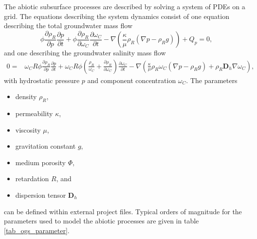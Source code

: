 The abiotic subsurface processes are described by solving a system of PDEs on a grid. The equations describing the system dynamics consist of one equation describing the total groundwater mass flow 
\begin{equation}
\phi\frac{\partial  \rho_R}{\partial p}\frac{\partial p}{\partial t} + \phi\frac{\partial \rho_R}{\partial \omega_C}\frac{\partial \omega_C}{\partial t} - \nabla \left(\frac{\kappa}{\mu}\rho_R \left(\nabla p - \rho_R g \right)\right) + Q_p = 0,
\end{equation}
and one describing the groundwater salinity mass flow
\begin{equation}
\begin{split}
0 =&
\omega_C R\phi\frac{\partial  \rho_R }{\partial p}\frac{\partial p}{\partial t}+\omega_C R\phi\left(\frac{\rho_R}{\omega_C}+\frac{\partial  \rho_R }{\partial \omega_C}\right)\frac{\partial \omega_C}{\partial t} - \nabla \left(  \frac{\kappa}{\mu} \rho_R \omega_C \left(\nabla p - \rho_R g \right) + \rho_R \mathbf{D}_h \nabla \omega_C\right),
\end{split}
\end{equation}
with hydrostatic pressure $p$ and component concentration $\omega_C$. 
The parameters 
\begin{itemize}
\item density $\rho_R$,
\item permeability $\kappa$,
\item viscosity $\mu$,
\item gravitation constant $g$,
\item medium porosity $\Phi$,
\item retardation $R$, and
\item dispersion tensor $\mathbf{D}_h$
\end{itemize}
can be defined within external project files.
Typical orders of magnitude for the parameters used to model the abiotic processes are given in table \ref{tab_ogs_parameter}.
